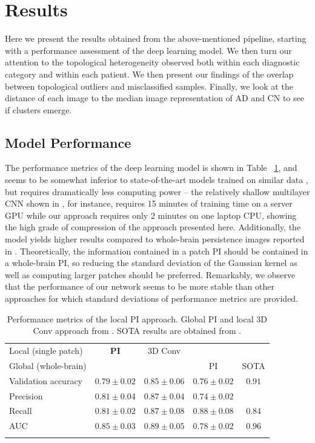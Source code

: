 \documentclass{article}
\begin{document}
\section{Results}\label{sec:results}

Here we present the results obtained from the above-mentioned pipeline, starting with a performance
assessment of the deep learning model. We then turn our attention to the topological heterogeneity
observed both within each diagnostic category and within each patient. We then present our findings
of the overlap between topological outliers and misclassified samples. Finally, we look at the
distance of each image to the median image representation of AD and CN to see if clusters
emerge.

\subsection{Model Performance}

The performance metrics of the deep learning model is shown in Table ~\ref{tab:performance}, and
seems to be somewhat inferior to state-of-the-art models trained on similar data
\citep{wen2020convolutional}, but requires dramatically less computing power -- the relatively
shallow multilayer CNN shown in \citet{bruningk2020image}, for instance, requires 15 minutes of
training time on a server GPU while our approach requires only 2 minutes on one laptop CPU, showing
the high grade of compression of the approach presented here. Additionally, the model yields higher
results compared to whole-brain persistence images reported in \citep{bruningk2020image}.
Theoretically, the information contained in a patch PI should be contained in a whole-brain PI, so
reducing the standard deviation of the Gaussian kernel as well as computing larger patches should be
preferred. Remarkably, we observe that the performance of our network seems to be more stable than
other approaches for which standard deviations of performance metrics are provided.

\begin{table}[b]
  \centering
  \begin{tabular}{lcccc}
    \toprule Local (single patch) & \textbf{PI} & 3D Conv & & \\ Global (whole-brain) &&& PI & SOTA \\ \midrule Validation
    accuracy & $0.79\pm 0.02$ & $0.85\pm 0.06$ & $ 0.76\pm 0.02$ & $0.91$\\ Precision & $0.81\pm
    0.04$ & $0.87\pm0.04$ & $0.74\pm 0.02$& \\ Recall & $0.81\pm 0.02$ & $0.87\pm0.08$ & $0.88\pm
    0.08$ &$0.84$\\ AUC & $0.85\pm 0.03$ & $0.89\pm0.05$ & $ 0.78\pm 0.02$ & $0.96$\\ \bottomrule
    \vspace{1pt}
  \end{tabular}
  \caption{Performance metrics of the local PI approach. Global PI and local 3D Conv approach from
    \citet{bruningk2020image}. SOTA results are obtained from \citet{liu2018anatomical}.}
  \label{tab:performance}
\end{table}
\end{document}
